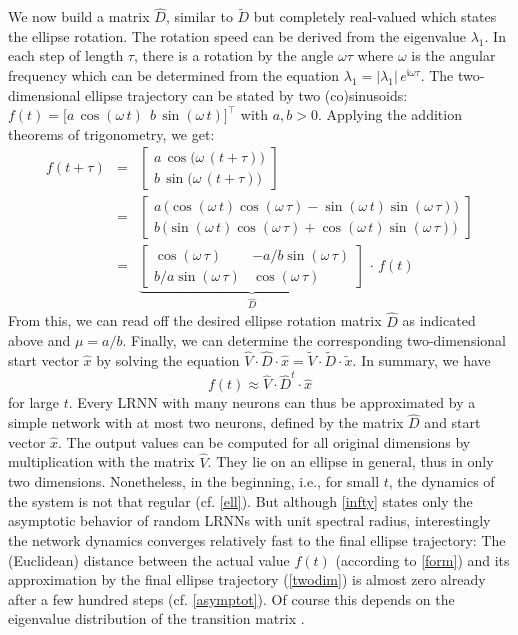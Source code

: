 \documentclass[twoside,11pt]{article}
\theoremstyle{definition}
\begin{document}
We now build a matrix $\hat{D}$, similar to $\tilde{D}$ but completely
real-valued which states the ellipse rotation. The rotation
speed can be derived from the eigenvalue $\lambda_1$. In each step of length
$\tau$, there is a rotation by the angle $\omega\tau$ where $\omega$ is the
angular frequency which can be determined from the equation $\lambda_1 =
|\lambda_1|\,e^{\mathfrak{i}\omega\tau}$. The two-dimensional ellipse trajectory can be stated by
two (co)sinusoids: $f(t) = \big[ a\,\cos(\omega\,t) ~~ b\,\sin(\omega\,t)
\big]^\top$ with $a,b > 0$. Applying the addition theorems of trigonometry, we
get:
\begin{eqnarray*}
	f(t+\tau) & = &
	\left[ \begin{array}{c} a\,\cos\!\big(\omega\,(t+\tau)\big) \\ b\,\sin\!\big(\omega\,(t+\tau)\big) \end{array} \right]\\ & = &
	\left[ \begin{array}{c}
		a\,\big(\!\cos(\omega\,t) \cos(\omega\,\tau) - \sin(\omega\,t) \sin(\omega\,\tau) \big) \\
		b\,\big(\!\sin(\omega\,t) \cos(\omega\,\tau) + \cos(\omega\,t) \sin(\omega\,\tau) \big)
	\end{array} \right] \\ & = &
	\underbrace{\left[ \begin{array}{cc}
		\cos(\omega\,\tau) & -a/b \sin(\omega\,\tau) \\
		b/a \sin(\omega\,\tau) & \cos(\omega\,\tau)
	\end{array} \right]}_{\displaystyle\hat{D}}\,\cdot\,f(t)
\end{eqnarray*}
From this, we can read off the desired ellipse rotation matrix $\hat{D}$ as
indicated above and $\mu = a/b$. Finally, we can determine the corresponding
two-dimensional start vector $\hat{x}$ by solving the equation $\hat{V} \cdot
\hat{D} \cdot \hat{x} = \tilde{V} \cdot \tilde{D} \cdot \tilde{x}$.
In summary, we have
\begin{equation}\label{twodim}
	f(t) \approx \hat{V} \cdot \hat{D}^t \cdot \hat{x}
\end{equation}
for large $t$. Every LRNN with many neurons can thus be
approximated by a simple network with at most two neurons, defined by the matrix
$\hat{D}$ and start vector $\hat{x}$. The output values can be computed for
all original dimensions by multiplication with the matrix $\hat{V}$. They lie on
an ellipse in general, thus in only two dimensions. Nonetheless, in the beginning, i.e., for small $t$, the
dynamics of the system is not that regular (cf. \cref{ell}). But although
\cref{infty} states only the asymptotic behavior of random LRNNs with unit spectral
radius, interestingly the network dynamics converges relatively fast to the
final ellipse trajectory: The (Euclidean) distance between the actual value
$f(t)$ (according to \cref{form}) and its approximation by the final ellipse
trajectory (\cref{twodim}) is almost zero already after a few hundred
steps (cf. \cref{asymptot}). Of course this depends on
the eigenvalue distribution of the transition matrix \citep{TV10}.
\end{document}
